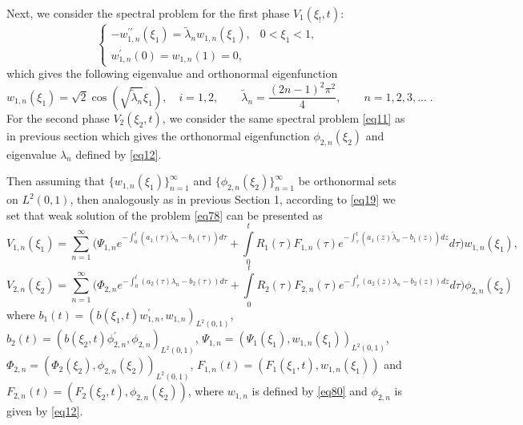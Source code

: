 \documentclass[preprint,12pt,authoryear]{elsarticle}
\begin{document}
Next, we consider the spectral problem for the first phase $V_1(\xi_!,t)$:
\begin{equation}\label{eq79}
    \begin{cases}
        -w_{1,n}^{\prime\prime}(\xi_1)=\widetilde{\lambda}_n w_{1,n}(\xi_1),&0<\xi_1<1,\\
        w_{1,n}^{\prime}(0)=w_{1,n}(1)=0,
    \end{cases}
\end{equation}
which gives the following eigenvalue and orthonormal eigenfunction 
\begin{equation}\label{eq80}
    w_{1,n}(\xi_1)=\sqrt{2}\cos\left(\sqrt{\widetilde{\lambda}_n}\xi_1\right),\quad i=1,2,\quad\quad \widetilde{\lambda}_n=\frac{(2n-1)^2\pi^2}{4},\quad\quad n=1,2,3,...\;.
\end{equation}
For the second phase $V_2(\xi_2,t)$, we consider the same spectral problem \eqref{eq11} as in previous section which gives the orthonormal eigenfunction $\phi_{2,n}(\xi_2)$ and eigenvalue $\lambda_n$ defined by \eqref{eq12}.

Then assuming that $\{w_{1,n}(\xi_1)\}_{n=1}^{\infty}$ and $\{\phi_{2,n}(\xi_2)\}_{n=1}^{\infty}$ be orthonormal sets on $L^2(0,1)$, then analogously as in previous Section 1, according to \eqref{eq19} we set that weak solution of the problem \eqref{eq78} can be presented as
\begin{equation}\label{eq81}
    V_{1,n}(\xi_1)=\sum\limits_{n=1}^{\infty}\Bigg(\Psi_{1,n}e^{-\int_0^t(a_1(\tau)\widetilde{\lambda}_n-b_1(\tau))d\tau}+\int\limits_0^t R_1(\tau)F_{1,n}(\tau)e^{-\int_{\tau}^t(a_1(z)\widetilde{\lambda}_n-b_1(z))dz}d\tau\Bigg)w_{1,n}(\xi_1),
\end{equation}
\begin{equation}\label{eq82}
    V_{2,n}(\xi_2)=\sum\limits_{n=1}^{\infty}\Bigg(\Phi_{2,n}e^{-\int_0^t(a_2(\tau)\lambda_n-b_2(\tau))d\tau}+\int\limits_0^t R_2(\tau)F_{2,n}(\tau)e^{-\int_{\tau}^t(a_2(z)\lambda_n-b_2(z))dz}d\tau\Bigg)\phi_{2,n}(\xi_2)
\end{equation}
where $b_1(t)=(b(\xi_1,t)w_{1,n}^{\prime},w_{1,n})_{L^2(0,1)}$, $b_2(t)=(b(\xi_2,t)\phi_{2,n}^{\prime},\phi_{2,n})_{L^2(0,1)}$, $\Psi_{1,n}=(\Psi_1(\xi_1),w_{1,n}(\xi_1))_{L^2(0,1)}$, $\Phi_{2,n}=(\Phi_2(\xi_2),\phi_{2,n}(\xi_2))_{L^2(0,1)}$, $F_{1,n}(t)=(F_{1}(\xi_1,t),w_{1,n}(\xi_1))$ and $F_{2,n}(t)=(F_{2}(\xi_2,t),\phi_{2,n}(\xi_2))$, where $w_{1,n}$ is defined by \eqref{eq80} and $\phi_{2,n}$ is given by \eqref{eq12}. 
\end{document}
